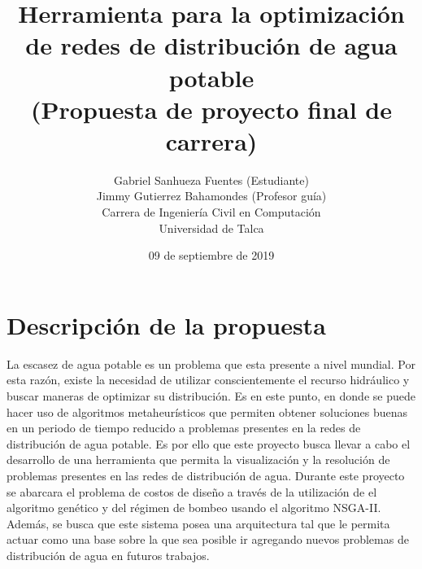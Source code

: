 \documentclass[11pt,letterpaper]{article}
\begin{document}
\pagestyle{empty}

\title{
Herramienta para la optimización de redes de distribución de agua potable\\
(Propuesta de proyecto final de carrera)
}
\author{
Gabriel Sanhueza Fuentes (Estudiante)\\
Jimmy Gutierrez Bahamondes (Profesor guía)\\
Carrera de Ingeniería Civil en Computación\\ 
Universidad de Talca}
\date{09 de septiembre de 2019}

\maketitle


\section{Descripción de la propuesta}


La escasez de agua potable es un problema que esta presente a nivel mundial. Por esta razón, existe la necesidad de utilizar conscientemente el recurso hidráulico y buscar maneras de optimizar su distribución. Es en este punto, en donde se puede hacer uso de algoritmos metaheurísticos que permiten obtener soluciones buenas en un periodo de tiempo reducido a problemas presentes en la redes de distribución de agua potable. Es por ello que este proyecto busca llevar a cabo el desarrollo de una herramienta que permita la visualización y la resolución de problemas presentes en las redes de distribución de agua. Durante este proyecto se abarcara el problema de costos de diseño a través de la utilización de el algoritmo genético y del régimen de bombeo usando el algoritmo NSGA-II. Además, se busca que este sistema posea una arquitectura tal que le permita actuar como una base sobre la que sea posible ir agregando nuevos problemas de distribución de agua en futuros trabajos.
\end{document}
